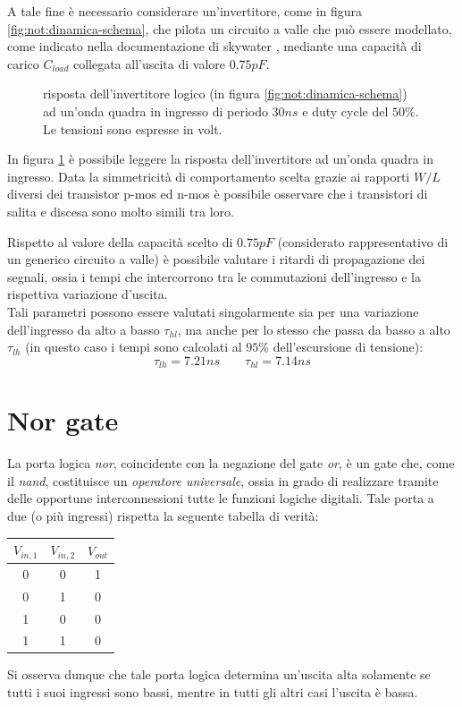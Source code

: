 		A tale fine è necessario considerare un'invertitore, come in figura \ref{fig:not:dinamica-schema}, che pilota un circuito a valle che può essere modellato, come indicato nella documentazione di skywater \cite{specprimitivecells}, mediante una capacità di carico $C_{load}$ collegata all'uscita di valore $0.75pF$.
	
		\begin{figure}[bht]
			\centering
			
			\vspace{2mm}
			\caption{risposta dell'invertitore logico (in figura \ref{fig:not:dinamica-schema}) ad un'onda quadra in ingresso di periodo $30ns$ e duty cycle del $50\%$.  Le tensioni sono espresse in volt.}
			\label{fig:not:dinamica}
		\end{figure}
		
		In figura \ref{fig:not:dinamica} è possibile leggere la risposta dell'invertitore ad un'onda quadra in ingresso. Data la simmetricità di comportamento scelta grazie ai rapporti $W/L$ diversi dei transistor p-mos ed n-mos è possibile osservare che i transistori di salita e discesa sono molto simili tra loro.
		
		Rispetto al valore della capacità scelto di $0.75pF$ (considerato rappresentativo di un generico circuito a valle) è possibile valutare i ritardi di propagazione dei segnali, ossia i tempi che intercorrono tra le commutazioni dell'ingresso e la rispettiva variazione d'uscita. \\		
		Tali parametri possono essere valutati singolarmente sia per una variazione dell'ingresso da alto a basso $\tau_{hl}$, ma anche per lo stesso che passa da basso a alto $\tau_{lh}$ (in questo caso i tempi sono calcolati al $95\%$ dell'escursione di tensione):
		\[ \tau_{lh} = 7.21ns \qquad \tau_{hl} = 7.14ns  \] 



\section{Nor gate}
	La porta logica \textit{nor}, coincidente con la negazione del gate \textit{or}, è un gate che, come il \textit{nand}, costituisce un \textit{operatore universale}, ossia in grado di realizzare tramite delle opportune interconnessioni tutte le funzioni logiche digitali. Tale porta a due (o più ingressi) rispetta la seguente tabella di verità:
	\begin{center}
		\begin{tabular}{c c | c}
			$V_{in,1}$ & $V_{in,2}$ & $V_{out}$ \\ \hline
			0 & 0 & 1 \\
			0 & 1 & 0 \\
			1 & 0 & 0 \\
			1 & 1 & 0 \\
		\end{tabular}
	\end{center}
	Si osserva dunque che tale porta logica determina un'uscita alta solamente se tutti i suoi ingressi sono bassi, mentre in tutti gli altri casi l'uscita è bassa.
	
